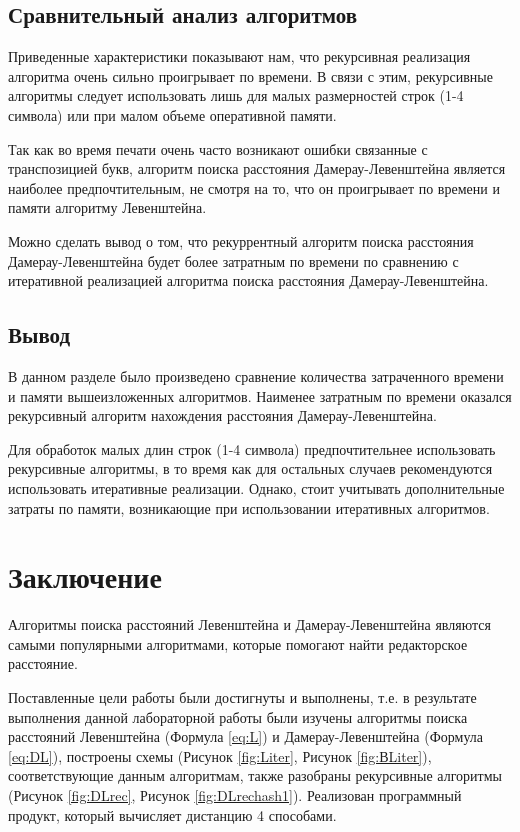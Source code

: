 \documentclass[a4paper,14pt, unknownkeysallowed]{bmstu}
\begin{document}
\clearpage

\section{Сравнительный анализ алгоритмов}

Приведенные характеристики показывают нам, что рекурсивная реализация алгоритма очень сильно проигрывает по времени. В связи с этим, рекурсивные алгоритмы следует использовать лишь для малых размерностей строк (1-4 символа) или при малом объеме оперативной памяти.

Так как во время печати очень часто возникают ошибки связанные с транспозицией букв, алгоритм поиска расстояния Дамерау-Левенштейна является наиболее предпочтительным, не смотря на то, что он проигрывает по времени и памяти алгоритму Левенштейна.

Можно сделать вывод о том, что рекуррентный алгоритм поиска расстояния Дамерау-Левенштейна будет более затратным по времени по сравнению с итеративной реализацией алгоритма поиска расстояния Дамерау-Левенштейна.

\section{Вывод}
В данном разделе было произведено сравнение количества затраченного времени и памяти вышеизложенных алгоритмов. Наименее затратным по времени оказался рекурсивный алгоритм нахождения расстояния Дамерау-Левенштейна.

Для обработок малых длин строк (1-4 символа) предпочтительнее использовать рекурсивные алгоритмы, в то время как для остальных случаев рекомендуются использовать итеративные реализации. Однако, стоит учитывать дополнительные затраты по памяти, возникающие при использовании итеративных алгоритмов.

\chapter*{Заключение}
Алгоритмы поиска расстояний Левенштейна и Дамерау-Левенштейна являются самыми популярными алгоритмами, которые помогают найти редакторское расстояние.

Поставленные цели работы были достигнуты и выполнены, т.е. в результате выполнения данной лабораторной работы были изучены алгоритмы поиска расстояний Левенштейна (Формула \ref{eq:L}) и Дамерау-Левенштейна (Формула \ref{eq:DL}), построены схемы (Рисунок \ref{fig:Liter}, Рисунок \ref{fig:ВLiter}), соответствующие данным алгоритмам, также разобраны рекурсивные алгоритмы (Рисунок \ref{fig:DLrec}, Рисунок \ref{fig:DLrechash1}). Реализован программный продукт, который вычисляет дистанцию 4 способами.
\end{document}
